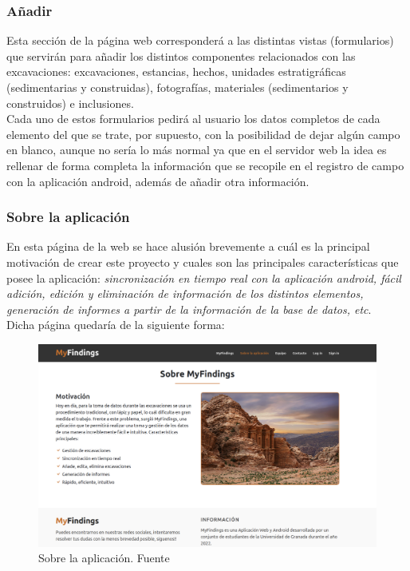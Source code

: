     \subsubsection{Añadir}
    Esta sección de la página web corresponderá a las distintas vistas (formularios) que
    servirán para añadir los distintos componentes relacionados con las excavaciones:
    excavaciones, estancias, hechos, unidades estratigráficas (sedimentarias y construidas),
    fotografías, materiales (sedimentarios y construidos) e inclusiones.\\

    Cada uno de estos formularios pedirá al usuario los datos completos de cada elemento del
    que se trate, por supuesto, con la posibilidad de dejar algún campo en blanco, aunque
    no sería lo más normal ya que en el servidor web la idea es rellenar de forma completa
    la información que se recopile en el registro de campo con la aplicación android, además
    de añadir otra información.

    \subsubsection{Sobre la aplicación}
    En esta página de la web se hace alusión brevemente a cuál es la principal motivación
    de crear este proyecto y cuales son las principales características que posee la
    aplicación: \textit{sincronización en tiempo real con la aplicación android, fácil
    adición, edición y eliminación de información de los distintos elementos, generación
    de informes a partir de la información de la base de datos, etc}.\\

    Dicha página quedaría de la siguiente forma:
        
        \begin{figure}[H]
            \centering
            \includegraphics[scale=0.20]{imagenes/about.png}
            \caption[Sobre la aplicación]{Sobre la aplicación. Fuente \cite{petra-ad-deir}}
            \label{fig:about}
        \end{figure}

